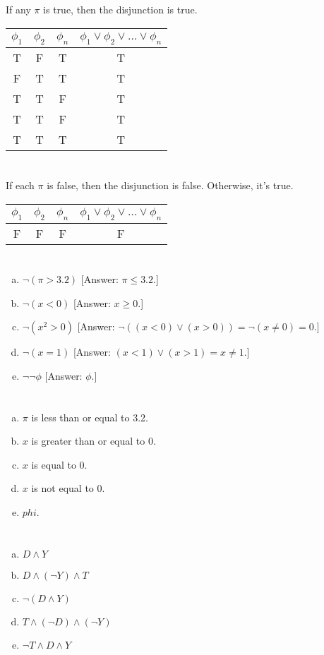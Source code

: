 \documentclass{article}
\begin{document}
If any $\pi$ is true, then the disjunction is true.

\begin{tabular}{ | c | c | c | c | }
  \hline
  $\phi_1$ & $\phi_2$ & $\phi_n$ & $\phi_1 \vee \phi_2 \vee \dots \vee \phi_n$ \\
  \hline
  T & F & T & T \\
  F & T & T & T \\
  T & T & F & T \\
  T & T & F & T \\
  T & T & T & T \\
  \hline
\end{tabular}

\section{}

If each $\pi$ is false, then the disjunction is false. Otherwise, it's true.

\begin{tabular}{ | c | c | c | c | }
  \hline
  $\phi_1$ & $\phi_2$ & $\phi_n$ & $\phi_1 \vee \phi_2 \vee \dots \vee \phi_n$ \\
  \hline
  F & F & F & F \\
  \hline
\end{tabular}


\section{}

\begin{enumerate}[(a)]
\item $\neg(\pi > 3.2)$ [Answer: $\pi \leq 3.2$.]
\item $\neg(x < 0)$ [Answer: $x \geq 0$.]
\item $\neg(x^2 > 0)$ [Answer: $\neg((x < 0) \vee (x > 0)) = \neg(x \neq 0) = 0$.]
\item $\neg(x = 1)$ [Answer: $(x < 1) \vee (x > 1) = x \neq 1$.]
\item $\neg\neg\phi$ [Answer: $\phi$.]
\end{enumerate}

\section{}

\begin{enumerate}[(a)]
\item $\pi$ is less than or equal to 3.2.
\item $x$ is greater than or equal to 0.
\item $x$ is equal to 0.
\item $x$ is not equal to 0.
\item $phi$.
\end{enumerate}

\section{}

\begin{enumerate}[(a)]
\item $D \wedge Y$
\item $D \wedge (\neg Y) \wedge T$
\item $\neg(D \wedge Y)$
\item $T \wedge (\neg D) \wedge (\neg Y)$
\item $\neg T \wedge D \wedge Y$
\end{enumerate}
\end{document}
